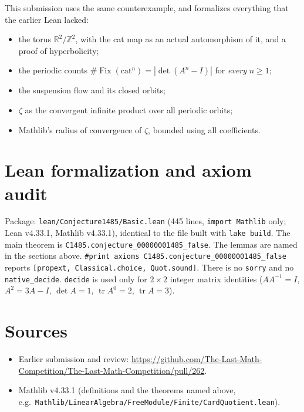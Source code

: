 \documentclass[11pt]{article}
\theoremstyle{definition}
\newcommand{\tr}{\operatorname{tr}}
\newcommand{\Fix}{\operatorname{Fix}}
\newcommand{\Z}{\mathbb{Z}}
\newcommand{\R}{\mathbb{R}}
\begin{document}
This submission uses the same counterexample, and formalizes everything that the earlier Lean lacked:
\begin{itemize}
\item the torus $\R^2/\Z^2$, with the cat map as an actual automorphism of it, and a proof of
hyperbolicity;
\item the periodic counts $\#\Fix(\mathrm{cat}^n)=|\det(A^n-I)|$ for \emph{every} $n\ge1$;
\item the suspension flow and its closed orbits;
\item $\zeta$ as the convergent infinite product over all periodic orbits;
\item Mathlib's radius of convergence of $\zeta$, bounded using all coefficients.
\end{itemize}

\section{Lean formalization and axiom audit}

Package: \texttt{lean/Conjecture1485/Basic.lean} (445 lines, \texttt{import Mathlib} only; Lean
v4.33.1, Mathlib v4.33.1), identical to the file built with \texttt{lake build}. The main theorem is
\texttt{C1485.conjecture\_00000001485\_false}. The lemmas are named in the sections above.
\texttt{\#print axioms C1485.conjecture\_00000001485\_false} reports
\texttt{[propext, Classical.choice, Quot.sound]}. There is no \texttt{sorry} and no
\texttt{native\_decide}. \texttt{decide} is used only for $2\times2$ integer matrix identities
($AA^{-1}=I$, $A^2=3A-I$, $\det A=1$, $\tr A^0=2$, $\tr A=3$).

\section*{Sources}
\begin{itemize}
\item Earlier submission and review: \url{https://github.com/The-Last-Math-Competition/The-Last-Math-Competition/pull/262}.
\item Mathlib v4.33.1 (definitions and the theorems named above, e.g.\
\texttt{Mathlib/LinearAlgebra/FreeModule/Finite/CardQuotient.lean}).
\end{itemize}
\end{document}
